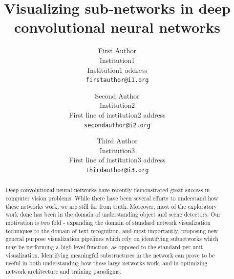 \documentclass[10pt,twocolumn,letterpaper]{article}
\begin{document}
\title{Visualizing sub-networks in deep convolutional neural networks}


\author{First Author\\
Institution1\\
Institution1 address\\
{\tt\small firstauthor@i1.org}
\and
Second Author\\
Institution2\\
First line of institution2 address\\
{\tt\small secondauthor@i2.org}
\and
Third Author\\
Institution3\\
First line of institution3 address\\
{\tt\small thirdauthor@i3.org}
}


\maketitle


\begin{abstract}
  Deep convolutional neural networks have recently demonstrated great success in computer vision problems. While there have been several efforts to understand how these networks work, we are still far from truth. Moreover, most of the exploratory work done has been in the domain of understanding object and scene detectors. Our motivation is two fold - expanding the domain of standard network visualization techniques to the domain of text recognition, and most importantly, proposing new general purpose visualization pipelines which rely on identifying subnetworks which may be performing a high level function, as opposed to the standard per unit visualization. Identifying meaningful substructures in the network can prove to be useful in both understanding how these large networks work, and in optimizing network architecture and training paradigms.
\end{abstract}


\end{document}
